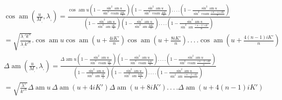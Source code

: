 \documentclass{article}
\begin{document}
\[
\begin{gathered}
\cos\operatorname{am}\left(\frac{u}{M_{,}},\lambda_{,}\right)=\frac{\cos\operatorname{am}u\left(1-\frac{\sin^{2}\operatorname{am}u}{\sin^{2}\operatorname{coam}\frac{2iK'}{n}}\right)\left(1-\frac{\sin^{2}\operatorname{am}u}{\sin^{2}\operatorname{coam}\frac{4iK'}{n}}\right).\,.\,.\,.\left(1-\frac{\sin^{2}\operatorname{am}u}{\sin^{2}\operatorname{coam}\frac{(n-1)iK'}{n}}\right)}{\left(1-\frac{\sin^{2}\operatorname{am}u}{\sin^{2}\operatorname{am}\frac{iK'}{n}}\right)\left(1-\frac{\sin^{2}\operatorname{am}u}{\sin^{2}\operatorname{am}\frac{3iK'}{n}}\right).\,.\,.\,.\left(1-\frac{\sin^{2}\operatorname{am}u}{\sin^{2}\operatorname{am}\frac{(n-2)iK'}{n}}\right)}\\[2.5ex]
=\sqrt{\frac{\lambda_{,}'k^{n}}{\lambda_{,}k'^{n}}}.\cos\operatorname{am}u\cos\operatorname{am}\left(u+\frac{4iK'}{n}\right)\cos\operatorname{am}\left(u+\frac{8iK'}{n}\right).\,.\,.\,.\cos\operatorname{am}\left(u+\frac{4(n-1)iK'}{n}\right)\\[2.5ex]
\Delta\operatorname{am}\left(\frac{u}{M_{,}},\lambda_{,}\right)=\frac{\Delta\operatorname{am}u\left(1-\frac{\sin^{2}\operatorname{am}u}{\sin^{2}\operatorname{coam}\frac{iK'}{n}}\right)\left(1-\frac{\sin^{2}\operatorname{am}u}{\sin^{2}\operatorname{coam}\frac{3iK'}{n}}\right).\,.\,.\,.\left(1-\frac{\sin^{2}\operatorname{am}u}{\sin^{2}\operatorname{coam}\frac{(n-2)iK'}{n}}\right)}{\left(1-\frac{\sin^{2}\operatorname{am}u}{\sin^{2}\operatorname{am}\frac{iK'}{n}}\right)\left(1-\frac{\sin^{2}\operatorname{am}u}{\sin^{2}\operatorname{am}\frac{3iK'}{n}}\right).\,.\,.\,.\left(1-\frac{\sin^{2}\operatorname{am}u}{\sin^{2}\operatorname{am}\frac{(n-2)iK'}{n}}\right)}\\[2.5ex]
=\sqrt{\frac{\lambda'}{k'^{n}}}\Delta\operatorname{am}u\,\Delta\operatorname{am}(u+4iK')\Delta\operatorname{am}(u+8iK').\,.\,.\,.\Delta\operatorname{am}(u+4(n-1)iK')
\end{gathered}
\]
\end{document}

